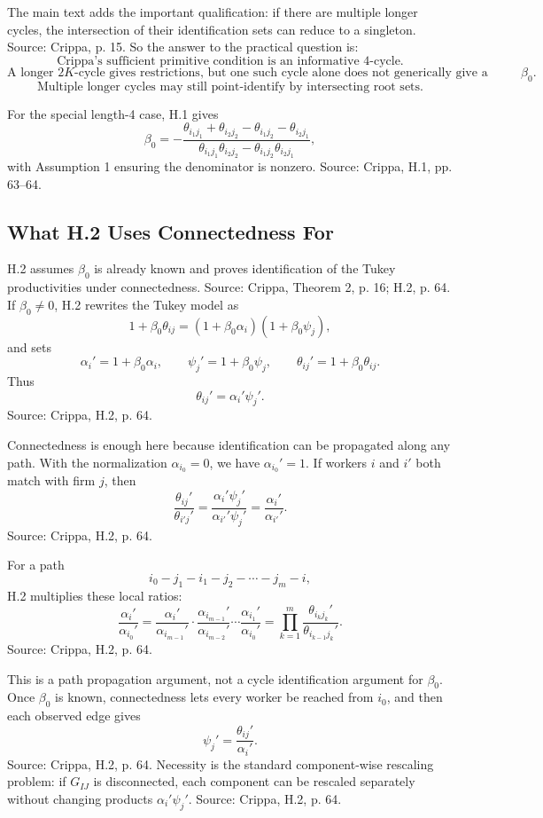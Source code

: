 \documentclass[11pt]{article}
\begin{document}
The main text adds the important qualification: if there are multiple longer
cycles, the intersection of their identification sets can reduce to a singleton.
Source: Crippa, p. 15. So the answer to the practical question is:
\[
\text{Crippa's sufficient primitive condition is an informative 4-cycle.}
\]
\[
\text{A longer }2K\text{-cycle gives restrictions, but one such cycle alone does not
generically give a unique }\beta_0.
\]
\[
\text{Multiple longer cycles may still point-identify by intersecting root sets.}
\]

For the special length-4 case, H.1 gives
\[
\beta_0
=-
\frac{\theta_{i_1j_1}+\theta_{i_2j_2}-\theta_{i_1j_2}-\theta_{i_2j_1}}
{\theta_{i_1j_1}\theta_{i_2j_2}-\theta_{i_1j_2}\theta_{i_2j_1}},
\]
with Assumption 1 ensuring the denominator is nonzero. Source: Crippa, H.1,
pp. 63--64.

\subsection{What H.2 Uses Connectedness For}

H.2 assumes $\beta_0$ is already known and proves identification of the Tukey
productivities under connectedness. Source: Crippa, Theorem 2, p. 16; H.2,
p. 64. If $\beta_0\neq0$, H.2 rewrites the Tukey model as
\[
1+\beta_0\theta_{ij}
=(1+\beta_0\alpha_i)(1+\beta_0\psi_j),
\]
and sets
\[
\alpha_i'=1+\beta_0\alpha_i,
\qquad
\psi_j'=1+\beta_0\psi_j,
\qquad
\theta_{ij}'=1+\beta_0\theta_{ij}.
\]
Thus
\[
\theta_{ij}'=\alpha_i'\psi_j'.
\]
Source: Crippa, H.2, p. 64.

Connectedness is enough here because identification can be propagated along any
path. With the normalization $\alpha_{i_0}=0$, we have $\alpha_{i_0}'=1$.
If workers $i$ and $i'$ both match with firm $j$, then
\[
\frac{\theta_{ij}'}{\theta_{i'j}'}
=
\frac{\alpha_i'\psi_j'}{\alpha_{i'}'\psi_j'}
=
\frac{\alpha_i'}{\alpha_{i'}'}.
\]
Source: Crippa, H.2, p. 64.

For a path
\[
i_0-j_1-i_1-j_2-\cdots-j_m-i,
\]
H.2 multiplies these local ratios:
\[
\frac{\alpha_i'}{\alpha_{i_0}'}
=
\frac{\alpha_i'}{\alpha_{i_{m-1}}'}
\cdot
\frac{\alpha_{i_{m-1}}'}{\alpha_{i_{m-2}}'}
\cdots
\frac{\alpha_{i_1}'}{\alpha_{i_0}'}
=
\prod_{k=1}^{m}\frac{\theta_{i_kj_k}'}{\theta_{i_{k-1}j_k}'}.
\]
Source: Crippa, H.2, p. 64.

This is a path propagation argument, not a cycle identification argument for
$\beta_0$. Once $\beta_0$ is known, connectedness lets every worker be reached
from $i_0$, and then each observed edge gives
\[
\psi_j'=\frac{\theta_{ij}'}{\alpha_i'}.
\]
Source: Crippa, H.2, p. 64. Necessity is the standard component-wise rescaling
problem: if $G_{IJ}$ is disconnected, each component can be rescaled separately
without changing products $\alpha_i'\psi_j'$. Source: Crippa, H.2, p. 64.
\end{document}
